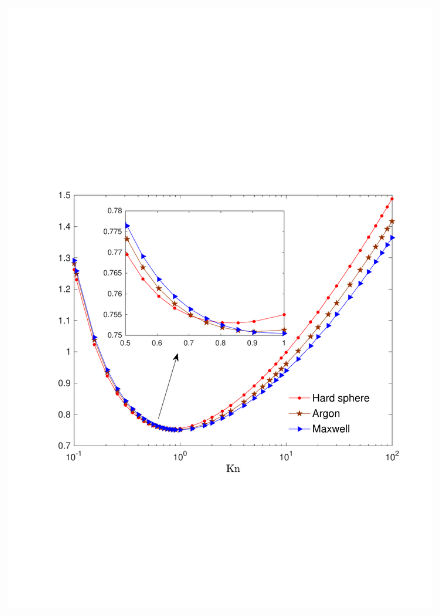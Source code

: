 \begin{figure}[t]
	{\includegraphics[scale=0.4]{LinearizedBol/IMG/pof_mass.pdf}}\quad

\end{figure}
